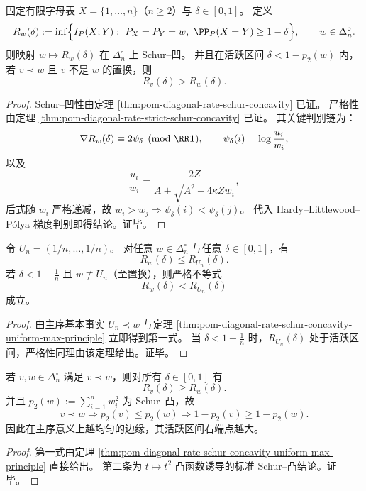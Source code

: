 \begin{theorem}\label{thm:pom-diagonal-rate-schur-concavity-uniform-max-principle}
固定有限字母表 \(X=\{1,\dots,n\}\)（\(n\ge 2\)）与 \(\delta\in[0,1]\)。
定义
\[
R_w(\delta):=\inf\Bigl\{I_P(X;Y):\ P_X=P_Y=w,\ \PP_P(X=Y)\ge 1-\delta\Bigr\},
\qquad w\in\Delta_n^\circ.
\]
则映射 \(w\mapsto R_w(\delta)\) 在 \(\Delta_n^\circ\) 上 Schur--凹。
并且在活跃区间
\(
\delta<1-p_2(w)
\)
内，若 \(v\prec w\) 且 \(v\) 不是 \(w\) 的置换，则
\[
R_v(\delta)>R_w(\delta).
\]
\end{theorem}
\begin{proof}
Schur--凹性由定理 \ref{thm:pom-diagonal-rate-schur-concavity} 已证。
严格性由定理 \ref{thm:pom-diagonal-rate-strict-schur-concavity} 已证。
其关键判别链为：
\[
\nabla R_w(\delta)\equiv 2\psi_\delta\pmod{\RR\mathbf 1},
\qquad
\psi_\delta(i)=\log\frac{u_i}{w_i},
\]
以及
\[
\frac{u_i}{w_i}
=\frac{2Z}{A+\sqrt{A^2+4\kappa Zw_i}},
\]
后式随 \(w_i\) 严格递减，故
\(
w_i>w_j\Rightarrow \psi_\delta(i)<\psi_\delta(j)
\)。
代入 Hardy--Littlewood--P\'olya 梯度判别即得结论。证毕。
\end{proof}

\begin{corollary}[均匀分布的唯一极大与最难边缘原则]\label{cor:pom-diagonal-rate-uniform-unique-maximizer-active}
令 \(U_n=(1/n,\dots,1/n)\)。
对任意 \(w\in\Delta_n^\circ\) 与任意 \(\delta\in[0,1]\)，有
\[
R_w(\delta)\le R_{U_n}(\delta).
\]
若 \(\delta<1-\frac1n\) 且 \(w\not\equiv U_n\)（至置换），则严格不等式
\[
R_w(\delta)<R_{U_n}(\delta)
\]
成立。
\end{corollary}
\begin{proof}
由主序基本事实 \(U_n\prec w\) 与定理
\ref{thm:pom-diagonal-rate-schur-concavity-uniform-max-principle}
立即得到第一式。
当 \(\delta<1-\frac1n\) 时，\(R_{U_n}(\delta)\) 处于活跃区间，严格性同理由该定理给出。证毕。
\end{proof}

\begin{corollary}[主序下的全曲线序与活跃区间单调嵌入]\label{cor:pom-diagonal-rate-majorization-full-curve-order}
若 \(v,w\in\Delta_n^\circ\) 满足 \(v\prec w\)，则对所有 \(\delta\in[0,1]\) 有
\[
R_v(\delta)\ge R_w(\delta).
\]
并且 \(p_2(w):=\sum_{i=1}^n w_i^2\) 为 Schur--凸，故
\[
v\prec w\Longrightarrow p_2(v)\le p_2(w)\Longrightarrow
1-p_2(v)\ge 1-p_2(w).
\]
因此在主序意义上越均匀的边缘，其活跃区间右端点越大。
\end{corollary}
\begin{proof}
第一式由定理
\ref{thm:pom-diagonal-rate-schur-concavity-uniform-max-principle}
直接给出。
第二条为 \(t\mapsto t^2\) 凸函数诱导的标准 Schur--凸结论。证毕。
\end{proof}

